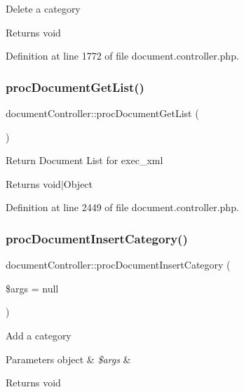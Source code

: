 Delete a category \begin{DoxyReturn}{Returns}
void 
\end{DoxyReturn}


Definition at line 1772 of file document.\+controller.\+php.

\hypertarget{classdocumentController_a23cf92fe7c204813d12c5996360cd939}{}\label{classdocumentController_a23cf92fe7c204813d12c5996360cd939} 
\subsubsection{\texorpdfstring{proc\+Document\+Get\+List()}{procDocumentGetList()}}
{\footnotesize\ttfamily document\+Controller\+::proc\+Document\+Get\+List (\begin{DoxyParamCaption}{ }\end{DoxyParamCaption})}

Return Document List for exec\+\_\+xml \begin{DoxyReturn}{Returns}
void$\vert$\+Object 
\end{DoxyReturn}


Definition at line 2449 of file document.\+controller.\+php.

\hypertarget{classdocumentController_aad9894e1432083a62a883568c7b3a42b}{}\label{classdocumentController_aad9894e1432083a62a883568c7b3a42b} 
\subsubsection{\texorpdfstring{proc\+Document\+Insert\+Category()}{procDocumentInsertCategory()}}
{\footnotesize\ttfamily document\+Controller\+::proc\+Document\+Insert\+Category (\begin{DoxyParamCaption}\item[{}]{\$args = {\ttfamily null} }\end{DoxyParamCaption})}

Add a category 
\begin{DoxyParams}[1]{Parameters}
object & {\em \$args} & \\
\hline
\end{DoxyParams}
\begin{DoxyReturn}{Returns}
void 
\end{DoxyReturn}


